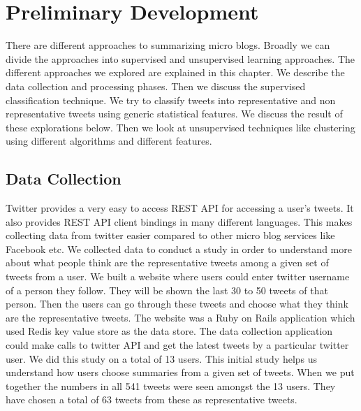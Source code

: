 \chapter{Preliminary Development}
\label{chap-three}

There are different approaches to summarizing micro blogs.  Broadly we can divide the approaches into supervised and unsupervised learning approaches. The different approaches we explored are explained in this chapter. We describe the data collection and processing phases. Then we discuss the supervised classification technique. We try to classify tweets into representative and non representative tweets using generic statistical features. We discuss the result of these explorations below.  Then we look at unsupervised techniques like clustering using different algorithms and different features.

\section{Data Collection}
Twitter provides a very easy to access REST API for accessing a user’s tweets. It also provides REST API client bindings in many different languages. This makes collecting data from twitter easier compared to other micro blog services like Facebook etc. We collected data to conduct a  study in order to understand more about what people think are the representative tweets among a given set of tweets from a user. We built a website where users could enter twitter username of a person they follow. They will be shown the last 30 to 50 tweets of that person. Then the users can go through these tweets and choose what they think are the representative tweets. The website was a Ruby on Rails application which used Redis key value store as the data store. The data collection application could make calls to twitter API and get the latest tweets by a particular twitter user. We did this study on a total of 13 users. This initial study helps us understand how users choose summaries from a given set of tweets. When we put together the numbers in all 541 tweets were seen amongst the 13 users. They have chosen a total of 63 tweets from these as representative tweets.

